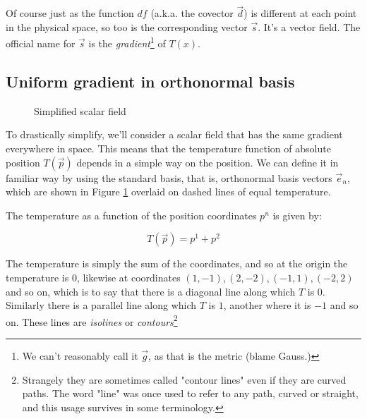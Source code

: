 Of course just as the function $df$ (a.k.a. the covector $\vec{d}$) is different at each point in the physical space, so too is the corresponding vector $\vec{s}$. It's a vector field. The official name for $\vec{s}$ is the \textit{gradient}\footnote{We can't reasonably call it $\vec{g}$, as that is the metric (blame Gauss.)} of $T(x)$.

\subsection{Uniform gradient in orthonormal basis}

\begin{figure}[h]
    \caption{Simplified scalar field}
    \centering
    \label{fig:scalar-field-std-basis}
\end{figure}

To drastically simplify, we'll consider a scalar field that has the same gradient everywhere in space. This means that the temperature function of absolute position $T(\vec{p})$ depends in a simple way on the position. We can define it in familiar way by using the standard basis, that is, orthonormal basis vectors $\vec{e}_n$, which are shown in Figure \ref{fig:scalar-field-std-basis} overlaid on dashed lines of equal temperature.

The temperature as a function of the position coordinates $p^n$ is given by:

\begin{equation}
    T(\vec{p}) = p^1 + p^2
    \label{eqn:t-absolute}
\end{equation}

The temperature is simply the sum of the coordinates, and so at the origin the temperature is $0$, likewise at coordinates $(1, -1), (2, -2), (-1, 1), (-2, 2)$ and so on, which is to say that there is a diagonal line along which $T$ is $0$. Similarly there is a parallel line along which $T$ is $1$, another where it is $-1$ and so on. These lines are \textit{isolines} or \textit{contours}\footnote{Strangely they are sometimes called "contour lines" even if they are curved paths. The word "line" was once used to refer to any path, curved or straight, and this usage survives in some terminology.}


